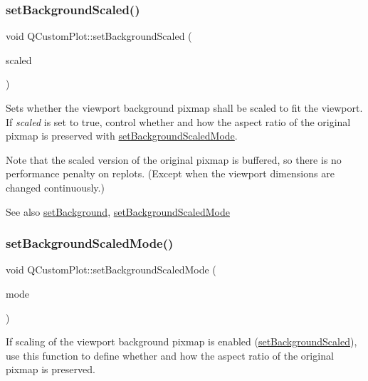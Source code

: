 \subsubsection{\texorpdfstring{set\+Background\+Scaled()}{setBackgroundScaled()}}
{\footnotesize\ttfamily void Q\+Custom\+Plot\+::set\+Background\+Scaled (\begin{DoxyParamCaption}\item[{bool}]{scaled }\end{DoxyParamCaption})}

Sets whether the viewport background pixmap shall be scaled to fit the viewport. If {\itshape scaled} is set to true, control whether and how the aspect ratio of the original pixmap is preserved with \hyperlink{class_q_custom_plot_a4c0eb4865b7949f62e1cb97db04a3de0}{set\+Background\+Scaled\+Mode}.

Note that the scaled version of the original pixmap is buffered, so there is no performance penalty on replots. (Except when the viewport dimensions are changed continuously.)

\begin{DoxySeeAlso}{See also}
\hyperlink{class_q_custom_plot_a130358592cfca353ff3cf5571b49fb00}{set\+Background}, \hyperlink{class_q_custom_plot_a4c0eb4865b7949f62e1cb97db04a3de0}{set\+Background\+Scaled\+Mode} 
\end{DoxySeeAlso}
\hypertarget{class_q_custom_plot_a4c0eb4865b7949f62e1cb97db04a3de0}{}\label{class_q_custom_plot_a4c0eb4865b7949f62e1cb97db04a3de0} 
\subsubsection{\texorpdfstring{set\+Background\+Scaled\+Mode()}{setBackgroundScaledMode()}}
{\footnotesize\ttfamily void Q\+Custom\+Plot\+::set\+Background\+Scaled\+Mode (\begin{DoxyParamCaption}\item[{Qt\+::\+Aspect\+Ratio\+Mode}]{mode }\end{DoxyParamCaption})}

If scaling of the viewport background pixmap is enabled (\hyperlink{class_q_custom_plot_a36f0fa1317325dc7b7efea615ee2de1f}{set\+Background\+Scaled}), use this function to define whether and how the aspect ratio of the original pixmap is preserved.

